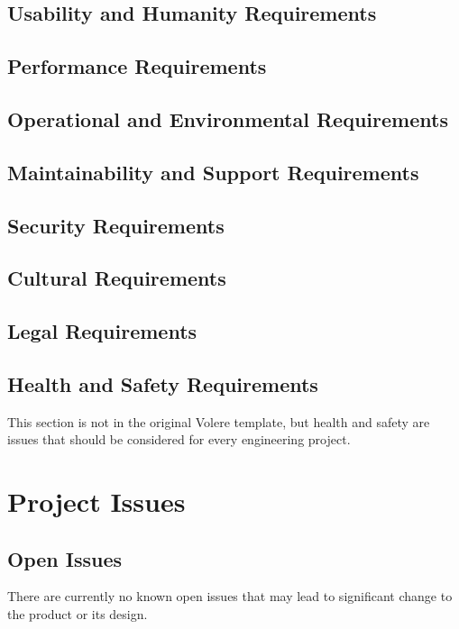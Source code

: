 \documentclass[12pt]{article}
\begin{document}
\subsection{Usability and Humanity Requirements}

\subsection{Performance Requirements}

\subsection{Operational and Environmental Requirements}

\subsection{Maintainability and Support Requirements}

\subsection{Security Requirements}

\subsection{Cultural Requirements}

\subsection{Legal Requirements}

\subsection{Health and Safety Requirements}

This section is not in the original Volere template, but health and safety are issues that should
be considered for every engineering project.

\section{Project Issues}

\subsection{Open Issues}

There are currently no known open issues that may lead to significant change to the product or its
design.
\end{document}
